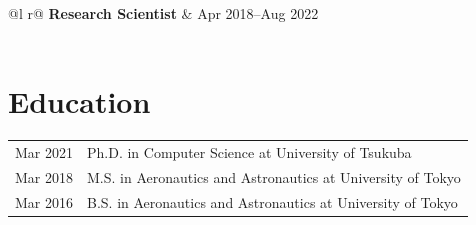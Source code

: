\begin{tabularx}{\linewidth}{ @{}l r@{} }
\textbf{Research Scientist} & \hfill Apr 2018--Aug 2022 \\[3.75pt]
 \\
\end{tabularx}
 
\section{Education}
\begin{tabularx}{\linewidth}{@{}l X@{}}	
Mar 2021 & Ph.D. in Computer Science at University of Tsukuba \\
Mar 2018 & M.S. in Aeronautics and Astronautics at University of Tokyo \\
Mar 2016 & B.S. in Aeronautics and Astronautics at University of Tokyo
\end{tabularx}
